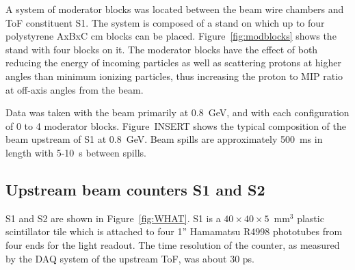     A system of moderator blocks was located between the beam wire chambers and ToF constituent S1.  The system is composed of a stand on which up to four polystyrene AxBxC cm blocks can be placed. Figure~\ref{fig:modblocks} shows the stand with four blocks on it. The moderator blocks have the effect of both reducing the energy of incoming particles as well as scattering protons at higher angles than minimum ionizing particles, thus increasing the proton to MIP ratio at off-axis angles from the beam. 
    
    Data was taken with the beam primarily at 0.8~GeV, and with each configuration of 0 to 4 moderator blocks. Figure~INSERT shows the typical composition of the beam upstream of S1 at 0.8~GeV. Beam spills are approximately 500~ms in length with 5-10~s between spills.  
    
    
    
	\subsection{Upstream beam counters S1 and S2}
	
	S1 and S2 are shown in Figure~\ref{fig:WHAT}. S1 is a $40\times40\times5$~mm$^3$ plastic scintillator tile which is attached to four 1'' Hamamatsu R4998 phototubes from four ends for the light readout. The time resolution of the counter, as measured by the DAQ system of the upstream ToF, was about 30 ps. 
	
